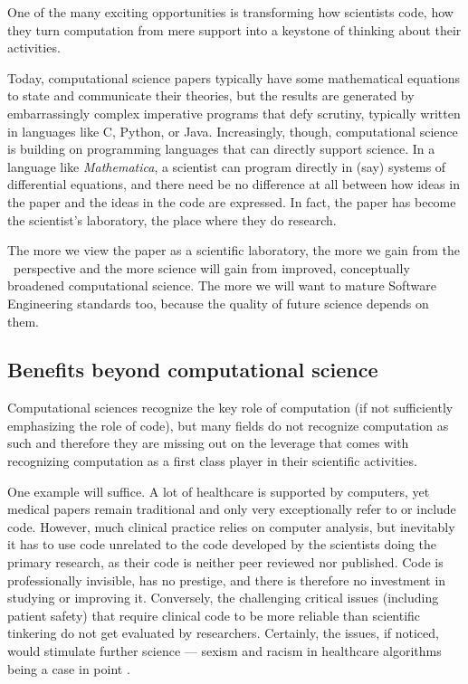 \documentclass{comjnl}
\begin{document}
\begin{change}
One of the many exciting opportunities is transforming how scientists code, how they turn computation from mere support into a keystone of thinking about their activities. 

Today, computational science papers typically have some mathematical equations to state and communicate their theories, but the results are generated by embarrassingly complex imperative programs that defy scrutiny, typically written in languages like C, Python, or Java. Increasingly, though, computational science is building on programming languages that can directly support science. In a language like \emph{Mathematica}, a scientist can program directly in (say) systems of differential equations, and there need be no difference at all between how ideas in the paper and the ideas in the code are expressed. In fact, the paper has become the scientist's laboratory, the place where they do research.

The more we view the paper as a scientific laboratory, the more we gain from the \RAPstar\ perspective and the more science will gain from improved, conceptually broadened computational science. The more we will want to mature Software Engineering standards too, because the quality of future science depends on them.

\subsection{Benefits beyond computational science}
Computational sciences recognize the key role of computation (if not sufficiently emphasizing the role of code), but many fields do not recognize computation as such and therefore they are missing out on the leverage that comes with recognizing computation as a first class player in their scientific activities. 

One example will suffice. A lot of healthcare is supported by computers, yet medical papers remain traditional and only very exceptionally refer to or include code. However, much clinical practice relies on computer analysis, but inevitably it has to use code unrelated to the code developed by the scientists doing the primary research, as their code is neither peer reviewed nor published. Code is professionally invisible, has no prestige, and there is therefore no investment in studying or improving it. Conversely, the challenging critical issues (including patient safety) that require clinical code to be more reliable than scientific tinkering do not get evaluated by researchers. Certainly, the issues, if noticed,  would stimulate further science --- sexism and racism in healthcare algorithms being a case in point \cite{fixit}. 


\end{change}
\end{document}
